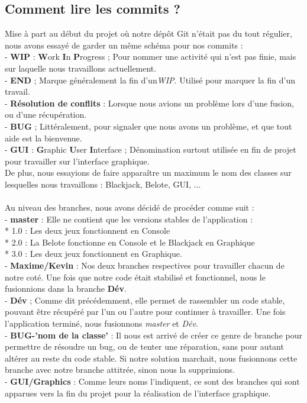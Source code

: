 \documentclass[a4paper]{report}
\begin{document}
\subsection{Comment lire les commits ?}
Mise à part au début du projet où notre dépôt Git n'était pas du tout régulier, nous avons essayé de garder un même schéma pour nos commits : \\
- \textbf{WIP} : \textbf{W}ork \textbf{I}n \textbf{P}rogress ; Pour nommer une activité qui n'est pas finie, mais sur laquelle nous travaillons actuellement. \\
- \textbf{END} ; Marque généralement la fin d'un\textit{WIP}. Utilisé pour marquer la fin d'un travail. \\
- \textbf{Résolution de conflits} : Lorsque nous avions un problème lors d'une fusion, ou d'une récupération.\\
- \textbf{BUG} ; Littéralement, pour signaler que nous avons un problème, et que tout aide est la bienvenue.\\
- \textbf{GUI} : \textbf{G}raphic \textbf{U}ser \textbf{I}nterface ; Dénomination surtout utilisée en fin de projet pour travailler sur l'interface graphique.\\
De plus, nous essayions de faire apparaître un maximum le nom des classes sur lesquelles nous travaillons : Blackjack, Belote, GUI, ...\\\\
Au niveau des branches, nous avons décidé de procéder comme suit :\\
- \textbf{master} : Elle ne contient que les versions stables de l'application : \\
* 1.0 : Les deux jeux fonctionnent en Console\\
* 2.0 : La Belote fonctionne en Console et le Blackjack en Graphique\\
* 3.0 : Les deux jeux fonctionnent en Graphique.\\
- \textbf{Maxime/Kevin} : Nos deux branches respectives pour travailler chacun de notre coté. Une fois que notre code était stabilisé et fonctionnel, nous le fusionnions dans la branche \textbf{Dév}.\\
- \textbf{Dév} ; Comme dit précédemment, elle permet de rassembler un code stable, pouvant être récupéré par l'un ou l'autre pour continuer à travailler. Une fois l'application terminé, nous fusionnons \textit{master} et \textit{Dév}.\\
- \textbf{BUG-'nom de la classe'} : Il nous est arrivé de créer ce genre de branche pour permettre de résoudre un bug, ou de tenter une réparation, sans pour autant altérer au reste du code stable. Si notre solution marchait, nous fusionnons cette branche avec notre branche attitrée, sinon nous la supprimions.\\
- \textbf{GUI/Graphics} : Comme leurs noms l'indiquent, ce sont des branches qui sont apparues vers la fin du projet pour la réalisation de l'interface graphique.
\end{document}
